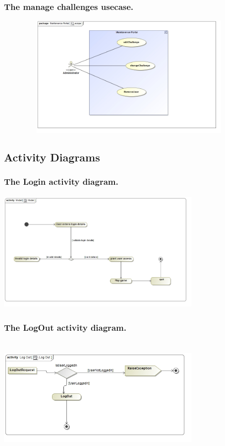 \documentclass[english]{article}
\begin{document}
		\subsubsection* {The manage challenges usecase.}
		\includegraphics[width=14cm,height=6cm,keepaspectratio]{Challenge.jpg}
		
		\subsection{Activity Diagrams}		
		
		\subsubsection* {The Login activity diagram.}
		\includegraphics[width=10cm,height=6cm,keepaspectratio]{Model.jpg}		
		
		\subsubsection* {The LogOut activity diagram.}
		\includegraphics[width=10cm,height=6cm,keepaspectratio]{LogOut.jpg}	
		
\end{document}
